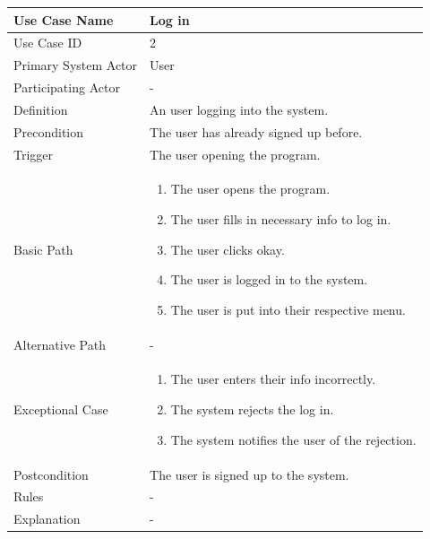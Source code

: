 \documentclass[a4paper,12pt]{report}
\begin{document}
		\begin{tabular}{|m{4cm}|m{11.5cm}|}
			\hline
				Use Case Name & Log in\\
			\hline
				Use Case ID & 2\\
			\hline
				Primary System Actor & User\\
			\hline
				Participating Actor & -\\
			\hline
				Definition & An user logging into the system.\\
			\hline
				Precondition & The user has already signed up before.\\
			\hline
				Trigger & The user opening the program.\\
			\hline
				Basic Path & \begin{enumerate}
					\item The user opens the program.
					\item The user fills in necessary info to log in.
					\item The user clicks okay.
					\item The user is logged in to the system.
					\item The user is put into their respective menu.
				\end{enumerate}		
				\\
			\hline
				Alternative Path & -\\
			\hline
				Exceptional Case & \begin{enumerate}
					\item The user enters their info incorrectly.
					\item The system rejects the log in.
					\item The system notifies the user of the rejection.
				\end{enumerate}
				\\
			\hline
				Postcondition & The user is signed up to the system.\\
			\hline
				Rules & -\\
			\hline
				Explanation & -\\
			\hline
		\end{tabular}
\end{document}
